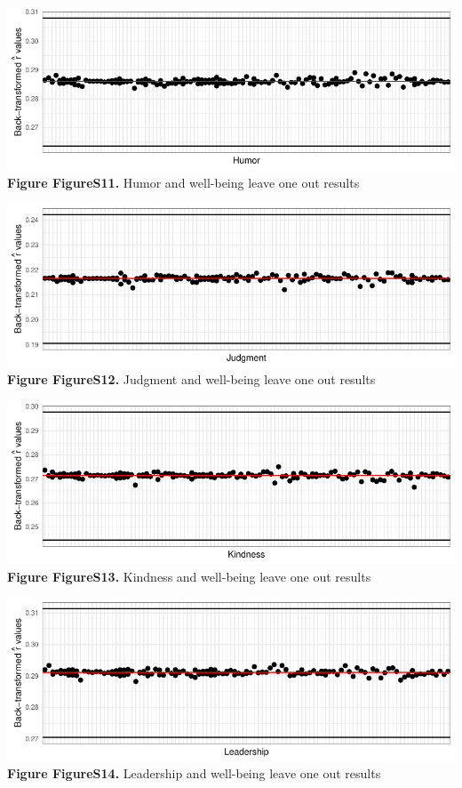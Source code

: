 \documentclass[
  letterpaper,
  DIV=11,
  numbers=noendperiod]{scrartcl}
\begin{document}
\includegraphics{SupplementaryResults_files/figure-pdf/unnamed-chunk-11-11.pdf}\textbf{Figure
FigureS11.} Humor and well-being leave one out results

\includegraphics{SupplementaryResults_files/figure-pdf/unnamed-chunk-11-12.pdf}\textbf{Figure
FigureS12.} Judgment and well-being leave one out results

\includegraphics{SupplementaryResults_files/figure-pdf/unnamed-chunk-11-13.pdf}\textbf{Figure
FigureS13.} Kindness and well-being leave one out results

\includegraphics{SupplementaryResults_files/figure-pdf/unnamed-chunk-11-14.pdf}\textbf{Figure
FigureS14.} Leadership and well-being leave one out results
\end{document}

